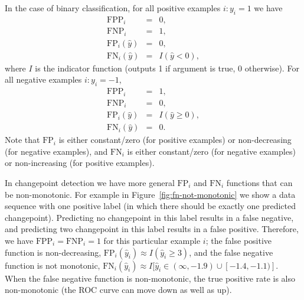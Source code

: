 \documentclass{article}
\begin{document}
In the case of binary classification, for all positive examples $i:y_i=1$ we have 
\begin{eqnarray}
  \text{FPP}_i&=&0,\\
  \text{FNP}_i&=&1, \\
  \text{FP}_i(\hat y) &=& 0, \\
  \text{FN}_i(\hat y) &=& I(\hat y < 0),
\end{eqnarray}
where $I$ is the indicator function (outputs 1 if argument is true, 0 otherwise).
For all negative examples $i:y_i=-1$,
\begin{eqnarray}
  \text{FPP}_i&=&1,\\
  \text{FNP}_i&=&0, \\
  \text{FP}_i(\hat y) &=& I(\hat y \geq 0), \\
  \text{FN}_i(\hat y) &=& 0.
\end{eqnarray}
Note that $\text{FP}_i$ is either constant/zero (for positive examples) or non-decreasing (for negative examples), and $\text{FN}_i$ is either constant/zero (for negative examples) or non-increasing (for positive examples).

In changepoint detection we have more general $\text{FP}_i$ and $\text{FN}_i$ functions that can be non-monotonic.
For example in Figure~\ref{fig:fn-not-monotonic} we show a data sequence with one positive label (in which there should be exactly one predicted changepoint).
Predicting no changepoint in this label results in a false negative, and predicting two changepoint in this label results in a false positive. 
Therefore, we have $\text{FPP}_i=\text{FNP}_i=1$ for this particular example $i$;
the false positive function is non-decreasing, $\text{FP}_i(\hat y_i) \approx I(\hat y_i \geq 3)$, and the false negative function is not monotonic, $\text{FN}_i(\hat y_i) \approx I[\hat y_i \in (\infty, -1.9)\cup [-1.4, -1.1)]$.
When the false negative function is non-monotonic, the true positive rate is also non-monotonic (the ROC curve can move down as well as up).
\end{document}
